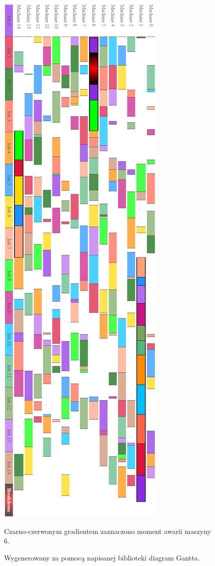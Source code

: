 \documentclass[archivemode]{mgr}
\begin{document}
\begin{figure}[!ht]
\begin{center}
\includegraphics[scale=0.52]{rysunki/scheduleTail00.png}
\caption{Wygenerowany za pomocą napisanej biblioteki diagram Gantta.}{Czarno-czerwonym gradientem zaznaczono moment awarii maszyny 6.}
\label{rys_Gantt_HTML}
\end{center}
\end{figure}
%
\end{document}
